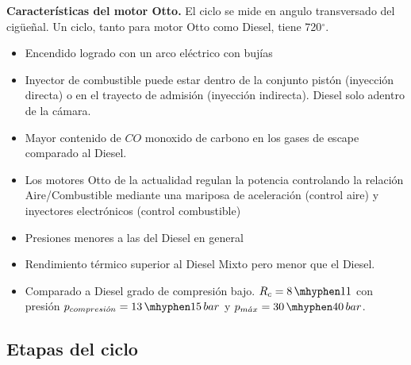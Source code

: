 \textbf{Características del motor Otto.}
El ciclo se mide en angulo transversado del cigüeñal. Un ciclo, tanto para motor Otto como Diesel, tiene 720$^\circ$. 
\begin{itemize}
\item Encendido logrado con un arco eléctrico con bujías
\item Inyector de combustible puede estar dentro de la conjunto pistón (inyección directa) o en el trayecto de admisión (inyección indirecta). Diesel solo adentro de la cámara.
\item Mayor contenido de $CO$ monoxido de carbono en los gases de escape comparado al Diesel.
\item Los motores Otto de la actualidad regulan la potencia controlando la relación Aire/Combustible mediante una mariposa de aceleración (control aire) y inyectores electrónicos (control combustible)
\item Presiones menores a las del Diesel en general
\item Rendimiento térmico superior al Diesel Mixto pero menor que el Diesel.
\item Comparado a Diesel grado de compresión bajo. $\rc = 8\,\mhyphen 11$ con presión $p_{compresi\acute{o}n}=13\,\mhyphen15\, bar$ y $p_\max=30\,\mhyphen40\,bar$.
\end{itemize}
\subsection{Etapas del ciclo}

